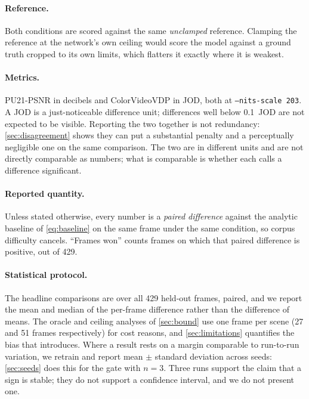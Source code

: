 \paragraph{Reference.} Both conditions are scored against the same
\emph{unclamped} reference. Clamping the reference at the network's own ceiling
would score the model against a ground truth cropped to its own limits, which
flatters it exactly where it is weakest.

\paragraph{Metrics.} PU21-PSNR \citep{pu21} in decibels and ColorVideoVDP
\citep{cvvdp} in JOD, both at \texttt{--nits-scale 203}. A JOD is a
just-noticeable difference unit; differences well below \num{0.1}~JOD are not
expected to be visible. Reporting the two together is not redundancy:
\cref{sec:disagreement} shows they can put a substantial penalty and a
perceptually negligible one on the same comparison. The two are in different
units and are not directly comparable as numbers; what is comparable is whether
each calls a difference significant.

\paragraph{Reported quantity.} Unless stated otherwise, every number is a
\emph{paired difference} against the analytic baseline of \cref{eq:baseline} on
the same frame under the same condition, so corpus difficulty cancels. ``Frames
won'' counts frames on which that paired difference is positive, out of 429.

\paragraph{Statistical protocol.} The headline comparisons are over all 429
held-out frames, paired, and we report the mean and median of the per-frame
difference rather than the difference of means. The oracle and ceiling analyses
of \cref{sec:bound} use one frame per scene (27 and 51 frames respectively) for
cost reasons, and \cref{sec:limitations} quantifies the bias that introduces.
Where a result rests on a margin comparable to run-to-run variation, we retrain
and report mean $\pm$ standard deviation across seeds: \cref{sec:seeds} does
this for the gate with $n = 3$. Three runs support the claim that a sign is
stable; they do not support a confidence interval, and we do not present one.
